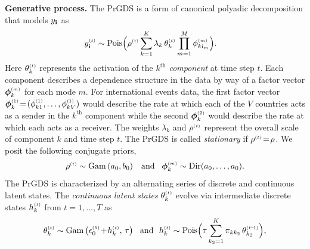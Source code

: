 \documentclass{article}
\begin{document}
\textbf{Generative process.} The PrGDS is a form of canonical polyadic decomposition \cite{harshman1970foundations} that models $y_{\textbf{\textrm{i}}}$ as~
\begin{align}
\label{eq:tensor_likelihood}
\ydt &\sim \textrm{Pois}\Big(\rhot \sum_{k = 1}^K \lambda_k \, \thetakt \prod_{m=1}^M \phi^{\mathsmaller{(m)}}_{k \osub_m}\Big).
\end{align}
Here $\thetakt$ represents the activation of the $k^{\textrm{th}}$ \emph{component} at time step $t$. Each component describes a dependence structure in the data by way of a factor vector $\boldsymbol{\phi}^{\mathsmaller{(m)}}_{k}$ for each mode $m$. For international events data, the first factor vector $\boldsymbol{\phi}^{\mathsmaller{(1)}}_{k} \teq (\phi^{\mathsmaller{(1)}}_{k1},\dots,\phi^{\mathsmaller{(1)}}_{kV})$ would describe the rate at which each of the $V$ countries acts as a sender in the $k^{\textrm{th}}$ component while the second $\boldsymbol{\phi}^{\mathsmaller{(2)}}_{k}$ would describe the rate at which each acts as a receiver. The weights $\lambda_k$ and $\rho^{\mathsmaller{(t)}}$ represent the overall scale of component $k$ and time step $t$. The PrGDS is called \emph{stationary} if $\rhot \teq \rho$. We posit the following conjugate priors,~
\begin{equation}
\rhot \sim \Gam{a_0, b_0} \,\,\,\textrm{ and }\,\,\, \boldsymbol{\phi}^{\mathsmaller{(m)}}_k \sim \textrm{Dir}(a_0,\dots,a_0).
\end{equation}
The PrGDS is characterized by an alternating series of discrete and continuous latent states. The \emph{continuous latent states} $\thetakt$ evolve via intermediate discrete states $\hkt$ from $t=1,\dots,T$ as~
\begin{equation}
\label{eq:thetaktandhkt}
\thetakt \sim \Gam{\epstheta \tp \hkt,\, \tau} \,\,\textrm{ and }\,\, \hkt \sim \textrm{Pois}\Big(\tau \sum_{k_2 = 1}^K \pi_{kk_2} \,\thetakttm\Big),
\end{equation}
\end{document}
